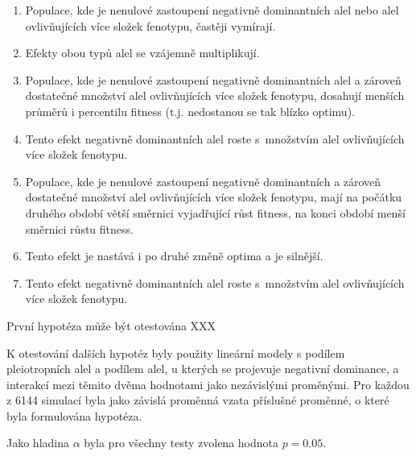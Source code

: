 \begin{enumerate}
    \item{Populace, kde je nenulové zastoupení negativně dominantních alel nebo alel ovlivňujících více složek fenotypu,
          častěji vymírají.}
    \item{Efekty obou typů alel se vzájemně multiplikují.}
    \item{Populace, kde je nenulové zastoupení negativně dominantních alel a zároveň dostatečné množství
          alel ovlivňujících více složek fenotypu, dosahují menších průměrů i percentilu fitness (t.j.
          nedostanou se tak blízko optimu).}
    \item{Tento efekt negativně dominantních alel roste s množstvím alel ovlivňujících více složek fenotypu.}
    \item{Populace, kde je nenulové zastoupení negativně dominantních a zároveň dostatečné množství alel ovlivňujících
          více složek fenotypu, mají na počátku druhého období větší směrnici vyjadřující růst fitness,
          na konci období menší směrnici růstu fitness.}
    \item{Tento efekt je nastává i po druhé změně optima a je silnější.}
    \item{Tento efekt negativně dominantních alel roste s množstvím alel ovlivňujících více složek fenotypu.}
\end{enumerate}

První hypotéza může být otestována XXX

K otestování dalších hypotéz byly použity lineární modely s podílem pleiotropních alel a podílem alel, u kterých se
projevuje negativní dominance, a interakcí mezi těmito dvěma hodnotami jako nezávislými proměnými. Pro každou z 6144
simulací byla jako závislá proměnná vzata příslušné proměnné, o které byla formulována hypotéza.

Jako hladina $\alpha$ byla pro všechny testy zvolena hodnota $ p = 0.05 $.